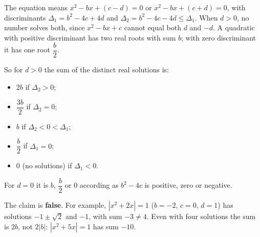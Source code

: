 The equation means $x^2-bx+(c-d)=0$ or $x^2-bx+(c+d)=0$, with discriminants $\Delta_1=b^2-4c+4d$ and $\Delta_2=b^2-4c-4d\le\Delta_1$. When $d>0$, no number solves both, since $x^2-bx+c$ cannot equal both $d$ and $-d$. A quadratic with positive discriminant has two real roots with sum $b$; with zero discriminant it has one root $\dfrac b2$.

So for $d>0$ the sum of the distinct real solutions is:
\begin{itemize}
\item $2b$ if $\Delta_2>0$;
\item $\dfrac{3b}{2}$ if $\Delta_2=0$;
\item $b$ if $\Delta_2<0<\Delta_1$;
\item $\dfrac b2$ if $\Delta_1=0$;
\item $0$ (no solutions) if $\Delta_1<0$.
\end{itemize}
For $d=0$ it is $b$, $\dfrac b2$ or $0$ according as $b^2-4c$ is positive, zero or negative.

The claim is \textbf{false}. For example, $\left|x^2+2x\right|=1$ ($b=-2$, $c=0$, $d=1$) has solutions $-1\pm\sqrt2$ and $-1$, with sum $-3\ne4$. Even with four solutions the sum is $2b$, not $2|b|$: $\left|x^2+5x\right|=1$ has sum $-10$.
